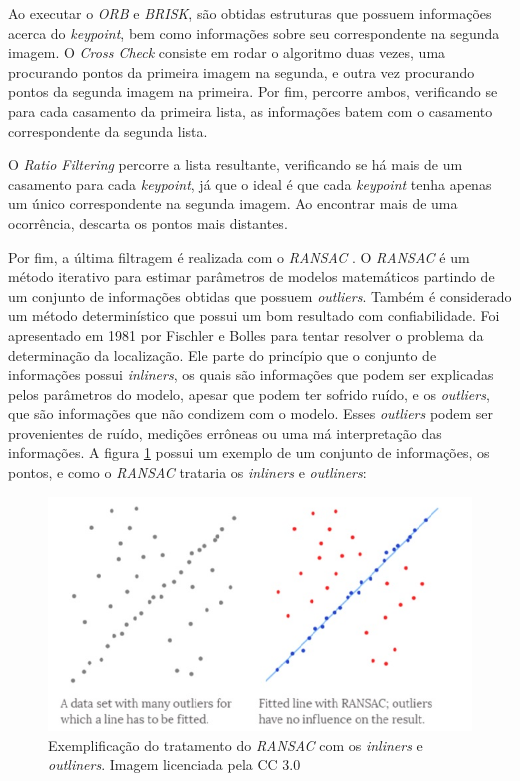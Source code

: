 Ao executar o \textit{ORB} e \textit{BRISK}, são obtidas estruturas que possuem informações acerca do \textit{keypoint}, bem como informações sobre seu correspondente na segunda imagem. O \textit{Cross Check} consiste em rodar o algoritmo duas vezes, uma procurando pontos da primeira imagem na segunda, e outra vez procurando pontos da segunda imagem na primeira. Por fim, percorre ambos, verificando se para cada casamento da primeira lista, as informações batem com o casamento correspondente da segunda lista.

O \textit{Ratio Filtering} percorre a lista resultante, verificando se há mais de um casamento para cada \textit{keypoint}, já que o ideal é que cada \textit{keypoint} tenha apenas um único correspondente na segunda imagem. Ao encontrar mais de uma ocorrência, descarta os pontos mais distantes.

Por fim, a última filtragem é realizada com o \textit{RANSAC} \cite{RANSAC}. O \textit{RANSAC} é um método iterativo para estimar parâmetros de modelos matemáticos partindo de um conjunto de informações obtidas que possuem \textit{outliers}. Também é considerado um método determinístico que possui um bom resultado com confiabilidade. Foi apresentado em 1981 por Fischler e Bolles para tentar resolver o problema da determinação da localização. Ele parte do princípio que o conjunto de informações possui \textit{inliners}, os quais são informações que podem ser explicadas pelos parâmetros do modelo, apesar que podem ter sofrido ruído, e os \textit{outliers}, que são informações que não condizem com o modelo. Esses \textit{outliers} podem ser provenientes de ruído, medições errôneas ou uma má interpretação das informações. A figura \ref{fig3:1} possui um exemplo de um conjunto de informações, os pontos, e como o \textit{RANSAC} trataria os \textit{inliners} e \textit{outliners}:

\begin{figure}[H]
	\centering
		\includegraphics{Imagens/figura3-1.jpg}
	\caption{Exemplificação do tratamento do \textit{RANSAC} com os \textit{inliners} e \textit{outliners}. Imagem licenciada pela CC 3.0}
	\label{fig3:1}
\end{figure}
  

